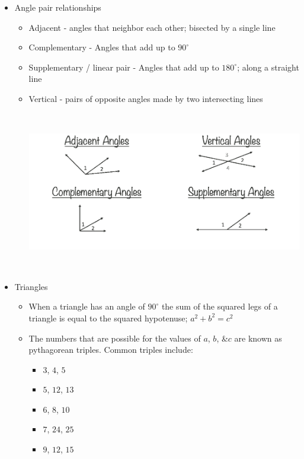 \documentclass[11pt,letterpaper]{article}
\begin{document}
\begin{minipage}{\textwidth}
     \begin{itemize}
          \item Angle pair relationships
          \begin{itemize}
               \item Adjacent - angles that neighbor each other; bisected by a single line
               \item Complementary - Angles that add up to $90^{\circ}$
               \item Supplementary / linear pair -  Angles that add up to $180^{\circ}$; along a straight line
               \item Vertical - pairs of opposite angles made by two intersecting lines
               
               \vspace{0.2cm}
               \includegraphics[height = 7cm]{images/anglrel.jpg}
          \end{itemize}
          \vspace{-0.5cm}
          \item Triangles
          \begin{itemize}
               \item When a triangle has an angle of $90^{\circ}$ the sum of the squared legs of a triangle is equal to the squared hypotenuse; $a^2+b^2=c^2$
               \item The numbers that are possible for the values of $a$, $b$, &$c$ are known as pythagorean triples. Common triples include:
               \begin{itemize}
                    \item $3$, $4$, $5$
                    \item $5$, $12$, $13$
                    \item $6$, $8$, $10$
                    \item $7$, $24$, $25$
                    \item $9$, $12$, $15$
                    

\end{itemize}
\end{itemize}
\end{itemize}
\end{minipage}
\end{document}
